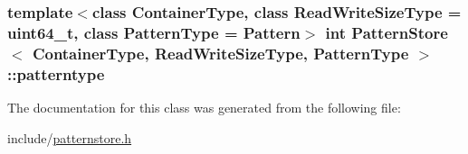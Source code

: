 \subsubsection[{patterntype}]{\setlength{\rightskip}{0pt plus 5cm}template$<$class Container\+Type, class Read\+Write\+Size\+Type = uint64\+\_\+t, class Pattern\+Type = Pattern$>$ int {\bf Pattern\+Store}$<$ Container\+Type, Read\+Write\+Size\+Type, {\bf Pattern\+Type} $>$\+::patterntype\hspace{0.3cm}{\ttfamily [protected]}}\label{classPatternStore_aa4ef383cb01f6842e97be70bea0e8c82}


The documentation for this class was generated from the following file\+:\begin{DoxyCompactItemize}
\item 
include/\hyperlink{patternstore_8h}{patternstore.\+h}\end{DoxyCompactItemize}
